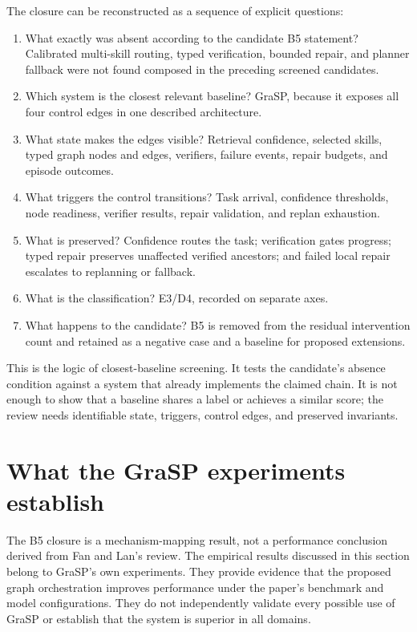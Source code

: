 The closure can be reconstructed as a sequence of explicit questions:

\begin{enumerate}
  \item What exactly was absent according to the candidate B5 statement? Calibrated multi-skill routing, typed verification, bounded repair, and planner fallback were not found composed in the preceding screened candidates.
  \item Which system is the closest relevant baseline? GraSP, because it exposes all four control edges in one described architecture.
  \item What state makes the edges visible? Retrieval confidence, selected skills, typed graph nodes and edges, verifiers, failure events, repair budgets, and episode outcomes.
  \item What triggers the control transitions? Task arrival, confidence thresholds, node readiness, verifier results, repair validation, and replan exhaustion.
  \item What is preserved? Confidence routes the task; verification gates progress; typed repair preserves unaffected verified ancestors; and failed local repair escalates to replanning or fallback.
  \item What is the classification? E3/D4, recorded on separate axes.
  \item What happens to the candidate? B5 is removed from the residual intervention count and retained as a negative case and a baseline for proposed extensions.
\end{enumerate}

This is the logic of closest-baseline screening. It tests the candidate's absence condition against a system that already implements the claimed chain. It is not enough to show that a baseline shares a label or achieves a similar score; the review needs identifiable state, triggers, control edges, and preserved invariants.

\section{What the GraSP experiments establish}
\label{sec:ch17-grasp-experiments}

The B5 closure is a mechanism-mapping result, not a performance conclusion derived from Fan and Lan's review. The empirical results discussed in this section belong to GraSP's own experiments. They provide evidence that the proposed graph orchestration improves performance under the paper's benchmark and model configurations. They do not independently validate every possible use of GraSP or establish that the system is superior in all domains.\autocite{xia2026grasp}

